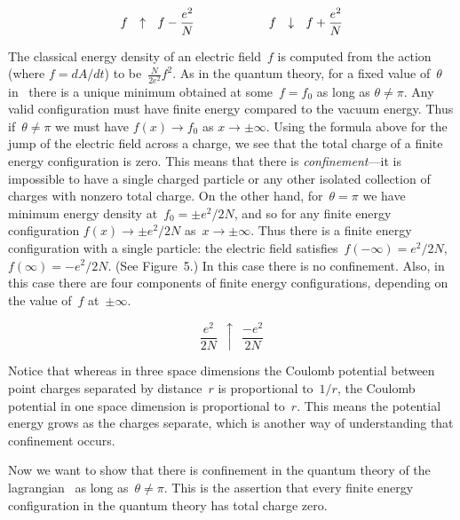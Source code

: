  \midinsert
 \bigskip
  $$ \hfil f \ \ \uparrow\ \  f - \frac{e^2}{N} \qquad\qquad \qquad   
   f \ \ \downarrow\ \  f + \frac{e^2}{N}\hfil 
  $$
 \nobreak
 \endcaption
 \bigskip
 \endinsert


The classical energy density of an electric field~$f$ is computed from the
action~ (where $f=dA/dt$) to be~$\frac{N}{2e^2}f^2$.  As in the
quantum theory, for a fixed value of~$\theta $ in~ there is a
unique minimum obtained at some~$f=f_0$ as long as $\theta \not=\pi $.  Any
valid configuration must have finite energy compared to the vacuum energy.
Thus if~$\theta \not= \pi $ we must have $f(x)\to f_0$ as $x\to\pm\infty $.
Using the formula above for the jump of the electric field across a charge,
we see that the total charge of a finite energy configuration is zero.  This
means that there is {\it confinement\/}---it is impossible to have a single
charged particle or any other isolated collection of charges with nonzero
total charge.  On the other hand, for~$\theta =\pi $ we have minimum energy
density at~$f_0=\pm e^2/2N$, and so for any finite energy configuration
$f(x)\to\pm e^2/2N$ as~$x\to\pm\infty $.  Thus there is a finite energy
configuration with a single particle: the electric field satisfies~$f(-\infty
)=e^2/2N$, $f(\infty )=-e^2/2N$.  (See Figure~5.)  In this case there is no
confinement.  Also, in this case there are four components of finite energy
configurations, depending on the value of~$f$ at~$\pm\infty $.

 \midinsert
 \bigskip
  $$   \frac{e^2}{2N}\ \ \uparrow \ \ \frac{-e^2}{2N}$$

 \nobreak
 \endcaption
 \bigskip
 \endinsert


Notice that whereas in three space dimensions the Coulomb potential between
point charges separated by distance~$r$ is proportional to~$1/r$, the Coulomb
potential in one space dimension is proportional to~$r$.  This means the
potential energy grows as the charges separate, which is another way of
understanding that confinement occurs. 


Now we want to show that there is confinement in the quantum theory of the
lagrangian~ as long as~$\theta \not= \pi $.  This is the assertion
that every finite energy configuration in the quantum theory has total charge
zero. 
 
